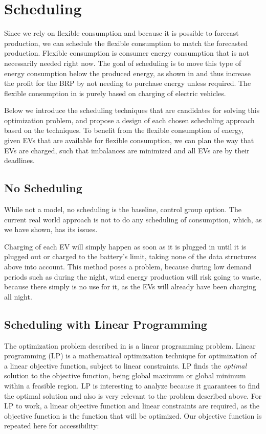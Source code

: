 \section{Scheduling}\label{sec:desScheduling}
Since we rely on flexible consumption and because it is possible to forecast production, we can schedule the flexible consumption to match the forecasted production. Flexible consumption is consumer energy consumption that is not necessarily needed right now. The goal of scheduling is to move this type of energy consumption below the produced energy, as shown in  and thus increase the profit for the BRP by not needing to purchase energy unless required. The flexible consumption in is purely based on charging of electric vehicles.  



Below we introduce the scheduling techniques that are candidates for solving this optimization problem, and propose a design of each chosen scheduling approach based on the techniques. To benefit from the flexible consumption of energy, given EVs that are available for flexible consumption, we can plan the way that EVs are charged, such that imbalances are minimized and all EVs are  by their deadlines. 

\subsection{No Scheduling}\label{sec:nosched}
While not a model, no scheduling is the baseline, control group option. The current real world approach is not to do any scheduling of consumption, which, as we have shown, has its issues. 

Charging of each EV will simply happen as soon as it is plugged in until it is plugged out or charged to the battery's limit, taking none of the data structures above into account. This method poses a problem, because during low demand periods such as during the night, wind energy production will risk going to waste, because there simply is no use for it, as the EVs will already have been charging all night. 

\subsection{Scheduling with Linear Programming}\label{sec:lpsched}
The optimization problem described in  is a linear programming problem. Linear programming (LP) is a mathematical optimization technique for optimization of a linear objective function, subject to linear constraints. LP finds the \emph{optimal} solution to the objective function, being global maximum or global minimum within a feasible region. LP is interesting to analyze because it guarantees to find the optimal solution and also is very relevant to the problem described above. For LP to work, a linear objective function and linear constraints are required, as the objective function is the function that will be optimized. Our objective function is repeated here for accessibility:

